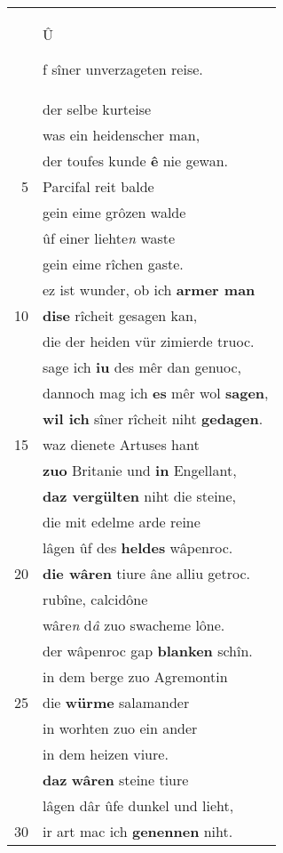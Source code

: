 \documentclass[8pt,a4paper,notitlepage]{article}
\begin{document}
\begin{table}[ht]
\begin{minipage}[t]{0.5\linewidth}
\begin{tabular}{rl}
 & \begin{large}Û\end{large}f sîner unverzageten reise.\\ 
 & der selbe kurteise\\ 
 & was ein heidenscher man,\\ 
 & der toufes kunde \textbf{ê} nie gewan.\\ 
5 & Parcifal reit balde\\ 
 & gein eime grôzen walde\\ 
 & ûf einer liehte\textit{n} waste\\ 
 & gein eime rîchen gaste.\\ 
 & ez ist wunder, ob ich \textbf{armer man}\\ 
10 & \textbf{dise} rîcheit gesagen kan,\\ 
 & die der heiden vür zimierde truoc.\\ 
 & sage ich \textbf{iu} des mêr dan genuoc,\\ 
 & dannoch mag ich \textbf{es} mêr wol \textbf{sagen},\\ 
 & \textbf{wil ich} sîner rîcheit niht \textbf{gedagen}.\\ 
15 & waz dienete Artuses hant\\ 
 & \textbf{zuo} Britanie und \textbf{in} Engellant,\\ 
 & \textbf{daz vergülten} niht die steine,\\ 
 & die mit edelme arde reine\\ 
 & lâgen ûf des \textbf{heldes} wâpenroc.\\ 
20 & \textbf{die wâren} tiure âne alliu getroc.\\ 
 & rubîne, calcidône\\ 
 & wâre\textit{n} d\textit{â} zuo swacheme lône.\\ 
 & der wâpenroc gap \textbf{blanken} schîn.\\ 
 & in dem berge zuo Agremontin\\ 
25 & die \textbf{würme} salamander\\ 
 & in worhten zuo ein ander\\ 
 & in dem heizen viure.\\ 
 & \textbf{daz} \textbf{wâren} steine tiure\\ 
 & lâgen dâr ûfe dunkel und lieht,\\ 
30 & ir art mac ich \textbf{genennen} niht.\\ 
\end{tabular}

\end{minipage}
\end{table}
\end{document}
